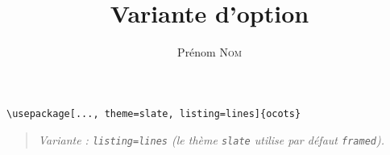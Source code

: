 \documentclass[11pt]{ocots-book}
\title{Variante d'option}
\author{Prénom \textsc{Nom}}
\newcommand{\ocotsvariantnote}[1]{\begin{quote}\itshape Variante : #1\end{quote}}
\begin{document}
\maketitle

\begin{lstlisting}
\usepackage[..., theme=slate, listing=lines]{ocots}
\end{lstlisting}
\ocotsvariantnote{\texttt{listing=lines} (le th\`eme \texttt{slate} utilise par d\'efaut \texttt{framed}).}

\end{document}
